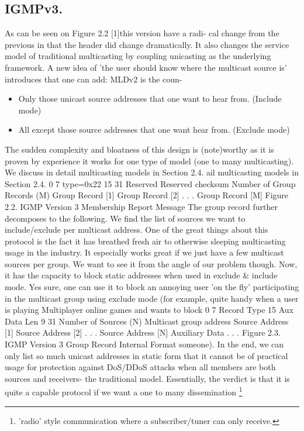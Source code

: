 \documentclass[11pt,left=2cm,bottom=2cm,oneside]{book}
\begin{document}
\subsection{IGMPv3.} As can be seen on Figure 2.2 [1]this version have a radi-
cal change from the previous in that the header did change dramatically. It
also
changes the service model of traditional multicasting by coupling unicasting
as the
underlying framework. A new idea of 'the user should know where the multicast
source is' introduces that one can add:
MLDv2 is the coun-
\begin{itemize}
\item Only those unicast source addresses that one want to hear from. (Include
mode)
\item All except those source addresses that one want hear from. (Exclude
mode)
\end{itemize}
The sudden complexity and bloatness of this design is (note)worthy as it is proven by
experience it works for one type of model (one to many multicasting). We
discuss
in detail multicasting models in Section 2.4.
ail multicasting models in Section 2.4.
0
7
type=0x22
15
31
Reserved
Reserved
checksum
Number of Group Records (M)
Group Record [1]
Group Record [2]
.
.
.
Group Record [M]
Figure 2.2. IGMP Version 3 Membership Report Message
The group record further decomposes to the following. We find the list of
sources we want to include/exclude per multicast address.
One of the great things about this protocol is the fact it has breathed fresh
air
to otherwise sleeping multicasting usage in the industry. It especially works
great
if we just have a few multicast sources per group. We want to see it from the
angle
of our problem though. Now, it has the capacity to block static addresses when
used in exclude \& include mode. Yes sure, one can use it to block an annoying
user
'on the fly' participating in the multicast group using exclude mode (for
example,
quite handy when a user is playing Multiplayer online games and wants to block
0
7
Record Type
15
Aux Data Len
9
31
Number of Sources (N)
Multicast group address
Source Address [1]
Source Address [2]
.
.
.
Source Address [N]
Auxiliary Data
.
.
.
Figure 2.3. IGMP Version 3 Group Record Internal Format
someone). In the end, we can only list so much unicast addresses in static
form
that it cannot be of practical usage for protection against DoS/DDoS attacks
when
all members are both sources and receivers- the traditional model.
Essentially, the
verdict is that it is quite a capable protocol if we want a one to many
dissemination
\footnote{'radio' style communication where a subscriber/tuner can only receive.}
\end{document}
